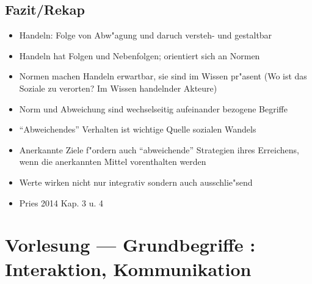 \documentclass[a4paper, 12pt]{scrartcl}
\newcommand{\Romann}[1]{\uppercase\expandafter{\romannumeral#1}}
\begin{document}
\subsection{Fazit/Rekap}
\begin{itemize}
	\item
		Handeln: Folge von Abw"agung und daruch versteh- und gestaltbar
	\item
		Handeln hat Folgen und Nebenfolgen; orientiert sich an Normen
	\item
	Normen machen Handeln erwartbar, sie sind im Wissen pr"asent (Wo ist das Soziale zu verorten? Im Wissen handelnder Akteure)
\item
	Norm und Abweichung sind wechselseitig aufeinander bezogene Begriffe
\item
	\enquote{Abweichendes} Verhalten ist wichtige Quelle sozialen Wandels
\item
	Anerkannte Ziele f"ordern auch \enquote{abweichende} Strategien ihres Erreichens, wenn die anerkannten Mittel vorenthalten werden
\item
	Werte wirken nicht nur integrativ sondern auch ausschlie"send
\item
	Pries 2014 Kap. 3 u. 4
\end{itemize}



\section{Vorlesung \Romann{4} --- Grundbegriffe \Romann{2}: Interaktion, Kommunikation}
\end{document}
